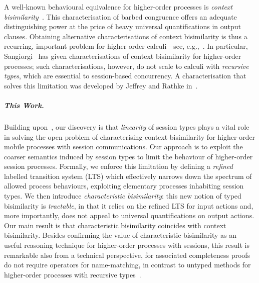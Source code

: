 \documentclass[a4paper,UKenglish]{lipics}
\theoremstyle{definition}
\begin{document}
A well-known behavioural equivalence for higher-order processes
is \emph{context bisimilarity}~\cite{San96H}. This 
 characterisation of %
barbed congruence 
offers an adequate distinguishing power at the price of heavy universal quantifications in output clauses.
Obtaining alternative 
characterisations of context bisimilarity
is thus a recurring, important problem 
for higher-order calculi---see, e.g.,~\cite{SangiorgiD:expmpa,San96H,JeffreyR05,DBLP:journals/cl/KoutavasH12,DBLP:journals/corr/Xu13a}. 
In particular, Sangiorgi~\cite{SangiorgiD:expmpa,San96H} has 
given %
characterisations of context bisimilarity
for higher-order processes; such 
characterisations, however,  %
do not scale to  
  calculi with \emph{recursive types}, which %
  are essential to %
session-based concurrency. A characterisation  
that solves this limitation was developed by Jeffrey and Rathke in~\cite{JeffreyR05}.

\subparagraph{This Work.}
Building upon~\cite{SangiorgiD:expmpa,San96H,JeffreyR05}, 
our discovery is that \emph{linearity} of session types plays a vital role 
in solving 
the %
open problem of characterising context bisimilarity for higher-order mobile processes with session communications.
Our approach is to exploit 
the coarser semantics induced by session types to limit
the behaviour of higher-order session processes. 
 Formally, we enforce this limitation by defining
a \emph{refined} labelled transition system (LTS)
which effectively 
narrows down the spectrum of allowed process behaviours, 
exploiting elementary processes inhabiting session types.
We then introduce \emph{characteristic bisimilarity}: this  
 new notion of typed bisimilarity   is 
\emph{tractable}, in that 
it relies on the refined LTS for input actions and, more importantly, 
does not appeal to universal quantifications on output actions. 
Our main result is that characteristic  %
bisimilarity coincides with context bisimilarity.
Besides confirming the value of characteristic bisimilarity as an useful reasoning technique for 
higher-order processes with sessions,
this result is 
remarkable 
also from a technical perspective, for associated 
completeness proofs do not require 
operators for 
name-matching,
in contrast to untyped methods for  higher-order processes
with recursive types~\cite{JeffreyR05}.
\end{document}

